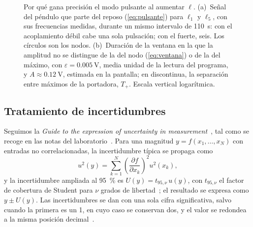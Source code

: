 \documentclass[a4paper,11pt]{amsart}
\numberwithin{equation}{section}
\newcommand{\Tp}{T_{+}}                       %
\theoremstyle{cienplano}
\theoremstyle{ciendef}
\theoremstyle{cienobs}
\begin{document}
\begin{figure}[ht]
\caption{Por qué gana precisión el modo pulsante al aumentar $\ell$.
(a)~Señal del péndulo que parte del reposo (\cref{eq:pulsante}) para $\ell_1$
y $\ell_5$, con sus frecuencias medidas, durante un mismo intervalo de
\SI{110}{\second}: con el acoplamiento débil cabe una sola pulsación; con el
fuerte, seis. Los círculos son los nodos. (b)~Duración de la ventana en la que
la amplitud no se distingue de la del nodo (\cref{eq:ventana}) o de la del
máximo, con $\varepsilon=\SI{0,005}{\volt}$, media unidad de la lectura del
programa, y $A\approx\SI{0,12}{\volt}$, estimada en la pantalla; en
discontinua, la separación entre máximos de la portadora, $\Tp$. Escala
vertical logarítmica.}
\label{fig:precision}
\end{figure}

\subsection{Tratamiento de incertidumbres}\label{sec:incertidumbres}
Seguimos la \emph{Guide to the expression of uncertainty in measurement}~\cite{GUM}, tal como se recoge en las notas del laboratorio~\cite{NUM-ARG}. Para una magnitud $y=f(x_1,\dots,x_N)$ con entradas no correlacionadas, la incertidumbre típica se propaga como
\begin{equation}\label{eq:propagacion}
  u^{2}(y)=\sum_{k=1}^{N}\left(\frac{\partial f}{\partial x_k}\right)^{\!2}u^{2}(x_k),
\end{equation}
y la incertidumbre ampliada al \SI{95}{\percent} es $U(y)=t_{95,\nu}\,u(y)$, con $t_{95,\nu}$ el factor de cobertura de Student para $\nu$ grados de libertad~\cite{NUM-ARG}; el resultado se expresa como $y\pm U(y)$. Las incertidumbres se dan con una sola cifra significativa, salvo cuando la primera es un 1, en cuyo caso se conservan dos, y el valor se redondea a la misma posición decimal~\cite{ERR-MP}.
\end{document}

